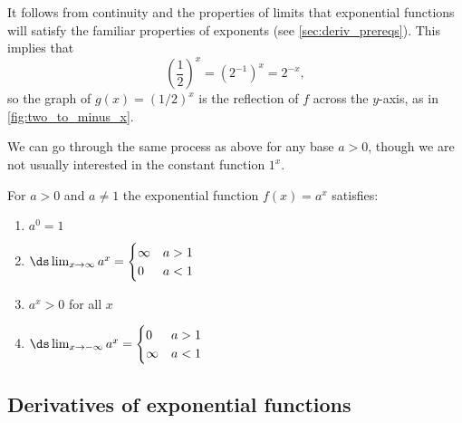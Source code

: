 It follows from continuity and the properties of limits that exponential functions will satisfy the familiar properties of exponents (see \autoref{sec:deriv_prereqs}).  This implies that
\[\left(\frac12\right)^x =(2^{-1})^x=2^{-x},\]
so the graph of $g(x)=(1/2)^x$ is the reflection of $f$ across the $y$-axis, as in \autoref{fig:two_to_minus_x}.

We can go through the same process as above for any base $a>0$, though we are not usually interested in the constant function $1^x$.

\begin{keyidea}\label{ki_exp_func_props}%
For $a>0$ and $a\neq1$ the exponential function $f(x)=a^x$ satisfies:
\begin{multicols}{2}
\begin{enumerate}
 \item $a^0=1$
 \item $\ds\lim_{x\to\infty}a^x=\begin{cases}\infty&a>1\\0&a<1\end{cases}$
 \item $a^x>0$ for all $x$
 \item $\ds\lim_{x\to-\infty}a^x=\begin{cases}0&a>1\\\infty&a<1\end{cases}$
\end{enumerate}
\end{multicols}
\end{keyidea}

\subsection{Derivatives of exponential functions}

